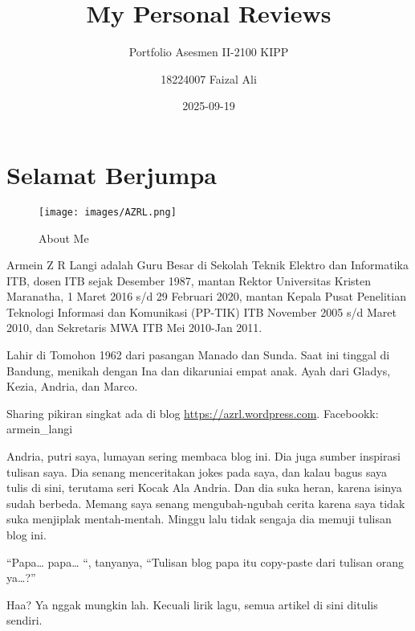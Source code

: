 \documentclass[
  letterpaper,
  DIV=11,
  numbers=noendperiod]{scrreprt}
\title{My Personal Reviews}
\subtitle{Portfolio Asesmen II-2100 KIPP}
\author{18224007 Faizal Ali}
\date{2025-09-19}
\renewcommand*\contentsname{Table of contents}
\newcommand\contentsname{Table of contents}
\begin{document}
\maketitle

\renewcommand*\contentsname{Table of contents}
{
\hypersetup{linkcolor=}
\setcounter{tocdepth}{2}
\tableofcontents
}


\chapter*{Selamat Berjumpa}\label{selamat-berjumpa}


\begin{figure}[H]

{\centering \texttt{[image: images/AZRL.png]}

}

\caption{About Me}

\end{figure}%

Armein Z R Langi adalah Guru Besar di Sekolah Teknik Elektro dan
Informatika ITB, dosen ITB sejak Desember 1987, mantan Rektor
Universitas Kristen Maranatha, 1 Maret 2016 s/d 29 Februari 2020, mantan
Kepala Pusat Penelitian Teknologi Informasi dan Komunikasi (PP-TIK) ITB
November 2005 s/d Maret 2010, dan Sekretaris MWA ITB Mei 2010-Jan 2011.

Lahir di Tomohon 1962 dari pasangan Manado dan Sunda. Saat ini tinggal
di Bandung, menikah dengan Ina dan dikaruniai empat anak. Ayah dari
Gladys, Kezia, Andria, dan Marco.

Sharing pikiran singkat ada di blog \url{https://azrl.wordpress.com}.
Facebookk: armein\_langi

Andria, putri saya, lumayan sering membaca blog ini. Dia juga sumber
inspirasi tulisan saya. Dia senang menceritakan jokes pada saya, dan
kalau bagus saya tulis di sini, terutama seri Kocak Ala Andria. Dan dia
suka heran, karena isinya sudah berbeda. Memang saya senang
mengubah-ngubah cerita karena saya tidak suka menjiplak mentah-mentah.
Minggu lalu tidak sengaja dia memuji tulisan blog ini.

``Papa\ldots{} papa\ldots{} ``, tanyanya, ``Tulisan blog papa itu
copy-paste dari tulisan orang ya\ldots?''

Haa? Ya nggak mungkin lah. Kecuali lirik lagu, semua artikel di sini
ditulis sendiri.
\end{document}
